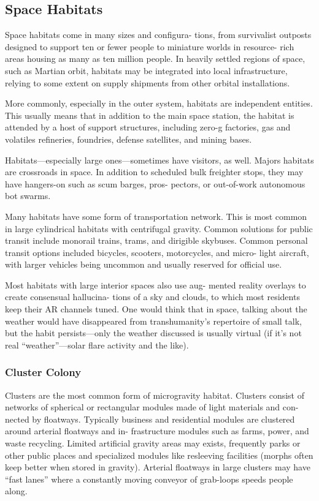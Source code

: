 \subsection{Space Habitats}

Space habitats come in many sizes and configura-
tions, from survivalist outposts designed to support 
ten or fewer people to miniature worlds in resource-
rich areas housing as many as ten million people. In 
heavily settled regions of space, such as Martian orbit, 
habitats may be integrated into local infrastructure, 
relying to some extent on supply shipments from other 
orbital installations.

More commonly, especially in the outer system, 
habitats are independent entities. This usually means 
that in addition to the main space station, the habitat 
is attended by a host of support structures, including 
zero-g factories, gas and volatiles refineries, foundries, 
defense satellites, and mining bases.

Habitats—especially large ones—sometimes have 
visitors, as well. Majors habitats are crossroads in 
space. In addition to scheduled bulk freighter stops, 
they may have hangers-on such as scum barges, pros-
pectors, or out-of-work autonomous bot swarms.

Many habitats have some form of transportation 
network. This is most common in large cylindrical 
habitats with centrifugal gravity. Common solutions 
for public transit include monorail trains, trams, and 
dirigible skybuses. Common personal transit options 
included bicycles, scooters, motorcycles, and micro-
light aircraft, with larger vehicles being uncommon 
and usually reserved for official use.

Most habitats with large interior spaces also use aug-
mented reality overlays to create consensual hallucina-
tions of a sky and clouds, to which most residents keep 
their AR channels tuned. One would think that in space, 
talking about the weather would have disappeared from 
transhumanity's repertoire of small talk, but the habit 
persists—only the weather discussed is usually virtual (if 
it's not real ``weather''—solar flare activity and the like).

\subsubsection{Cluster Colony}

Clusters are the most common form of microgravity 
habitat. Clusters consist of networks of spherical or 
rectangular modules made of light materials and con-
nected by floatways. Typically business and residential 
modules are clustered around arterial floatways and in-
frastructure modules such as farms, power, and waste 
recycling. Limited artificial gravity areas may exists, 
frequently parks or other public places and specialized 
modules like resleeving facilities (morphs often keep 
better when stored in gravity). Arterial floatways in 
large clusters may have ``fast lanes'' where a constantly 
moving conveyor of grab-loops speeds people along.

